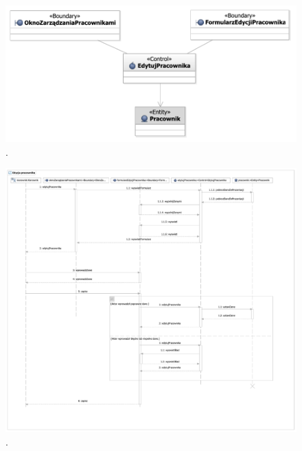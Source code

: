 \begin{figure}[H]
  \centering
  \includegraphics[angle=\ecbangle, scale=\ecbscale]{../img/usecase/pu3ecb.pdf}
  \caption{.}
\end{figure}
\begin{figure}[H]
  \centering
  \includegraphics[angle=\seqangle, scale=\seqscalemin]{../img/usecase/pu3seq.pdf}
  \caption{.}
\end{figure}
\newpage

